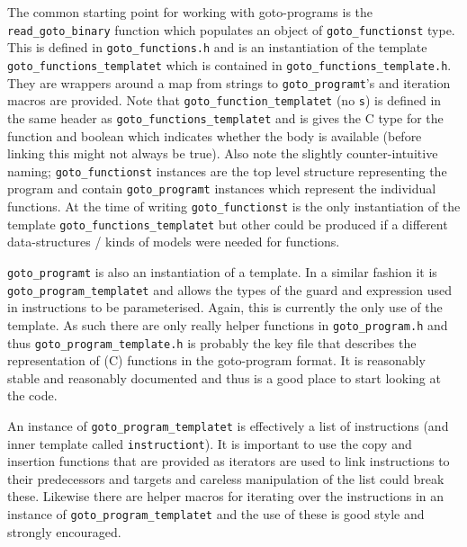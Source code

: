 \documentclass{article}
\newcommand{\file}[1]{\texttt{#1}}
\newcommand{\code}[1]{\texttt{#1}}
\begin{document}
The common starting point for working with goto-programs is the
\code{read\_goto\_binary} function which populates an object of
\code{goto\_functionst} type.  This is defined in
\file{goto\_functions.h} and is an instantiation of the template
\code{goto\_functions\_templatet} which is contained in
\file{goto\_functions\_template.h}.  They are wrappers around a map from
strings to \code{goto\_programt}'s and iteration macros are provided.
Note that \code{goto\_function\_templatet} (no \code{s}) is defined in
the same header as \code{goto\_functions\_templatet} and is gives the
C type for the function and boolean which indicates whether the body
is available (before linking this might not always be true).  Also
note the slightly counter-intuitive naming; \code{goto\_functionst}
instances are the top level structure representing the program and
contain \code{goto\_programt} instances which represent the individual
functions.  At the time of writing \code{goto\_functionst} is the only
instantiation of the template \code{goto\_functions\_templatet} but
other could be produced if a different data-structures / kinds of models
were needed for functions.

\code{goto\_programt} is also an instantiation of a template.  In a
similar fashion it is \code{goto\_program\_templatet} and allows the
types of the guard and expression used in instructions to be
parameterised.  Again, this is currently the only use of the template.
As such there are only really helper functions in
\file{goto\_program.h} and thus \code{goto\_program\_template.h} is
probably the key file that describes the representation of (C)
functions in the goto-program format.  It is reasonably stable and
reasonably documented and thus is a good place to start looking at the code.

An instance of \code{goto\_program\_templatet} is effectively a list
of instructions (and inner template called \code{instructiont}).  It
is important to use the copy and insertion functions that are provided
as iterators are used to link instructions to their predecessors and
targets and careless manipulation of the list could break these.
Likewise there are helper macros for iterating over the instructions
in an instance of \code{goto\_program\_templatet} and the use of these
is good style and strongly encouraged.
\end{document}
